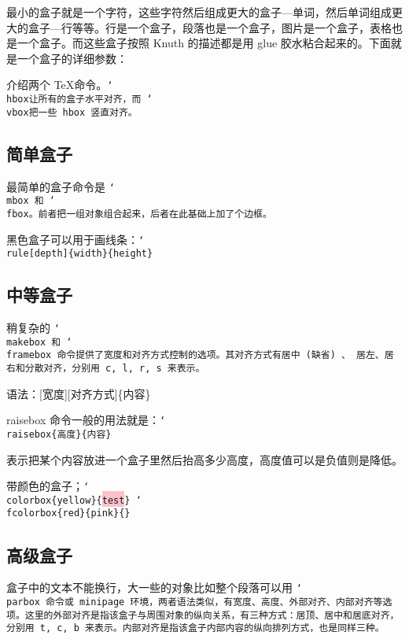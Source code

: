 \documentclass[a4paper]{article}
\newcommand\tbs[1][]{\tt\char`\\#1}
\begin{document}
  最小的盒子就是一个字符，这些字符然后组成更大的盒子---单词，然后单词组成更大的盒子---行等等。行是一个盒子，段落也是一个盒子，图片是一个盒子，表格也是一个盒子。而这些盒子按照 Knuth 的描述都是用 glue 胶水粘合起来的。下面就是一个盒子的详细参数：


  介绍两个 \TeX 命令。\tbs{hbox}让所有的盒子水平对齐，而 \tbs{vbox}把一些 hbox 竖直对齐。

  \subsection{简单盒子}
    最简单的盒子命令是 \tbs{mbox} 和 \tbs{fbox}。前者把一组对象组合起来，后者在此基础上加了个边框。

    黑色盒子可以用于画线条：\tbs{rule}[depth]\{width\}\{height\}
  \subsection{中等盒子}
    稍复杂的 \tbs{makebox} 和 \tbs{framebox} 命令提供了宽度和对齐方式控制的选项。其对齐方式有居中 (缺省) 、 居左、居右和分散对齐，分别用 c, l, r, s 来表示。

    语法：[宽度][对齐方式]\{内容\}

    raisebox 命令一般的用法就是：\tbs{raisebox}\{高度\}\{内容\}

    表示把某个内容放进一个盒子里然后抬高多少高度，高度值可以是负值则是降低。

    带颜色的盒子；\tbs{colorbox}\{yellow\}\{\colorbox{pink}{test}\}  \quad
    \tbs{fcolorbox}\{red\}\{pink\}\{\}
  \subsection{高级盒子}
    盒子中的文本不能换行，大一些的对象比如整个段落可以用 \tbs{parbox} 命令或 minipage 环境，两者语法类似，有宽度、高度、外部对齐、内部对齐等选项。这里的外部对齐是指该盒子与周围对象的纵向关系，有三种方式：居顶、居中和居底对齐，分别用 t, c, b 来表示。内部对齐是指该盒子内部内容的纵向排列方式，也是同样三种。
\end{document}
